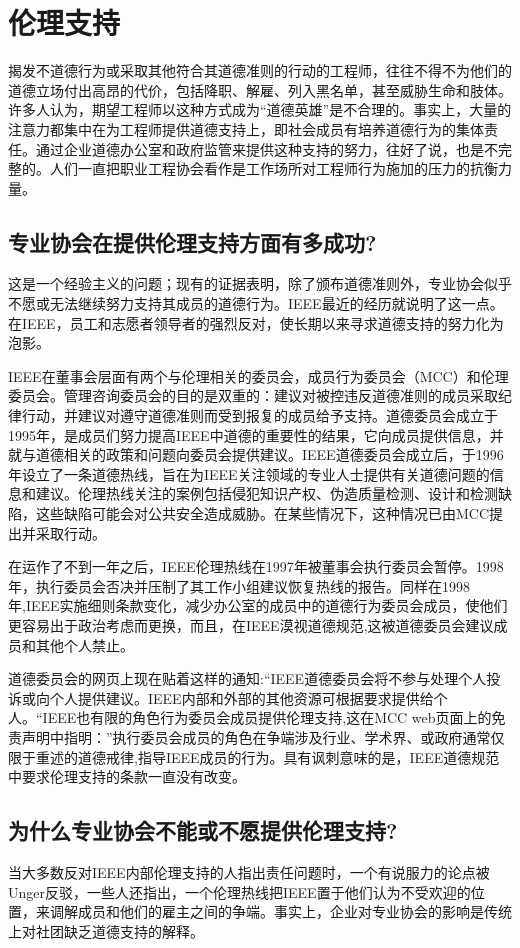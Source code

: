 \documentclass[lang=cn,11pt,a4paper]{elegantpaper}
\begin{document}
\section{伦理支持\cite{9}}
揭发不道德行为或采取其他符合其道德准则的行动的工程师，往往不得不为他们的道德立场付出高昂的代价，包括降职、解雇、列入黑名单，甚至威胁生命和肢体。许多人认为，期望工程师以这种方式成为“道德英雄”是不合理的\cite{15}。事实上，大量的注意力都集中在为工程师提供道德支持上，即社会成员有培养道德行为的集体责任。\cite{16}通过企业道德办公室和政府监管来提供这种支持的努力，往好了说，也是不完整的。人们一直把职业工程协会看作是工作场所对工程师行为施加的压力的抗衡力量。\cite{13}

\subsection{专业协会在提供伦理支持方面有多成功?}
这是一个经验主义的问题；现有的证据表明，除了颁布道德准则外，专业协会似乎不愿或无法继续努力支持其成员的道德行为。IEEE最近的经历就说明了这一点。在IEEE，员工和志愿者领导者的强烈反对，使长期以来寻求道德支持的努力化为泡影。

IEEE在董事会层面有两个与伦理相关的委员会，成员行为委员会（MCC）和伦理委员会。管理咨询委员会的目的是双重的：建议对被控违反道德准则的成员采取纪律行动，并建议对遵守道德准则而受到报复的成员给予支持。道德委员会成立于1995年，是成员们努力提高IEEE中道德的重要性的结果，它向成员提供信息，并就与道德相关的政策和问题向委员会提供建议。IEEE道德委员会成立后，于1996年设立了一条道德热线，旨在为IEEE关注领域的专业人士提供有关道德问题的信息和建议。伦理热线关注的案例包括侵犯知识产权、伪造质量检测、设计和检测缺陷，这些缺陷可能会对公共安全造成威胁。在某些情况下，这种情况已由MCC\cite{17}提出并采取行动。

在运作了不到一年之后，IEEE伦理热线在1997年被董事会执行委员会暂停。1998年，执行委员会否决并压制了其工作小组建议恢复热线的报告。\cite{17}同样在1998年,IEEE实施细则条款变化，减少办公室的成员中的道德行为委员会成员，使他们更容易出于政治考虑而更换，而且，在IEEE漠视道德规范,这被道德委员会建议成员和其他个人禁止。

道德委员会的网页\cite{18}上现在贴着这样的通知:“IEEE道德委员会将不参与处理个人投诉或向个人提供建议。IEEE内部和外部的其他资源可根据要求提供给个人。“IEEE也有限的角色行为委员会成员提供伦理支持,这在MCC web页面上的免责声明中指明：\cite{19}”执行委员会成员的角色在争端涉及行业、学术界、或政府通常仅限于重述的道德戒律,指导IEEE成员的行为。具有讽刺意味的是，IEEE道德规范中要求伦理支持的条款一直没有改变。

\subsection{为什么专业协会不能或不愿提供伦理支持?}
当大多数反对IEEE内部伦理支持的人指出责任问题时，一个有说服力的论点被Unger\cite{14,17}反驳，一些人还指出，一个伦理热线把IEEE置于他们认为不受欢迎的位置，来调解成员和他们的雇主之间的争端。事实上，企业对专业协会的影响是传统上对社团缺乏道德支持的解释。
\end{document}
